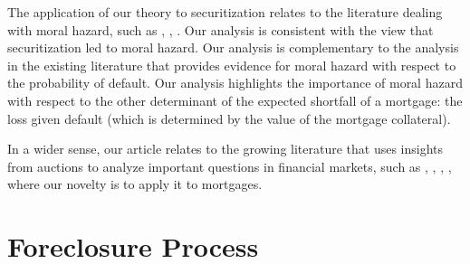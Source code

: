 \documentclass[11pt,twopage]{article}
\begin{document}


The application of our theory to securitization relates to the
literature dealing with moral hazard, such as \cite{mian2009consequences}, \cite{keys2008did},
\cite{tirole2011illiquidity}. Our analysis is consistent with the view that securitization led to moral hazard. Our analysis
is complementary to the analysis in the existing literature that
provides evidence for moral hazard with respect to the probability of
default. Our analysis highlights the importance of moral hazard with respect to the other
determinant of the expected shortfall of a mortgage: the loss given
default (which is determined by the value of the mortgage collateral).

In a wider sense, our article relates to the growing literature that
uses insights from auctions to analyze important questions in
financial markets, such as \cite{heller1998auctions},
\cite{hortacsu2010mechanism}, \cite{cassola20132007},
\cite{zulehner2013competition}, where our novelty is to apply it to mortgages.


\section{Foreclosure Process}
\end{document}
